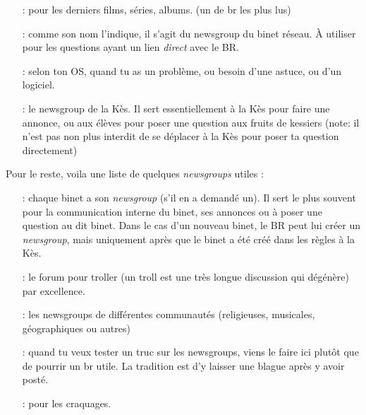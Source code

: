 \begin{itemize}
\item[\ngname{br.informatique.nouveautés} :] pour les derniers films, séries, albums. (un de br les plus lus)

\item[\ngname{br.binet.br} :] comme son nom l'indique, il s'agit du newsgroup du binet réseau. \`A utiliser pour les questions ayant un lien \emph{direct} avec le BR.

 \item[\ngname{br.informatique.windows/linux/mac} :] selon ton OS, quand tu as un problème, ou besoin d'une astuce, ou d'un logiciel.

 \item[\ngname{br.kes} :] le newsgroup de la Kès. Il sert essentiellement à la Kès pour faire une annonce, ou aux élèves pour poser une question aux fruits de kessiers (note: il n'est pas non plus interdit de se déplacer à la Kès pour poser ta question directement)

\end{itemize}



Pour le reste, voila une liste de quelques \emph{newsgroups} utiles :
\begin{itemize}
\item[\ngname{br.binet.ton\_binet} :] chaque binet a son \emph{newsgroup} (s'il en a demandé un). Il sert le plus souvent pour la communication interne du binet, ses annonces ou à poser une question au dit binet. Dans le cas d'un nouveau binet, le BR peut lui créer un \emph{newsgroup}, mais uniquement après que le binet a été créé dans les règles à la Kès.

\item[\ngname{br.binet.polemix} :] le forum pour troller (un troll est une très longue discussion qui dégénère) par excellence.
                          
\item[\ngname{br.communauté.*} :] les newsgroups de différentes communautés (religieuses, musicales, géographiques ou autres)

\item[\ngname{br.test} :] quand tu veux tester un truc sur les newsgroups, viens le faire ici plutôt que de pourrir un br utile. La tradition est d'y laisser une blague après y avoir posté.

 \item[\ngname{br.trash} :] pour les craquages.

\end{itemize}


